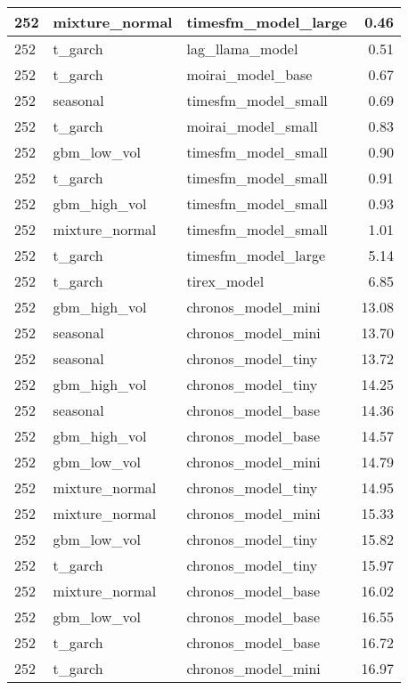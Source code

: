 {\begin{tabular}{lllr}
\midrule
252 & mixture\_normal & timesfm\_model\_large & 0.46 \\
\midrule
252 & t\_garch & lag\_llama\_model & 0.51 \\
\midrule
252 & t\_garch & moirai\_model\_base & 0.67 \\
\midrule
252 & seasonal & timesfm\_model\_small & 0.69 \\
\midrule
252 & t\_garch & moirai\_model\_small & 0.83 \\
\midrule
252 & gbm\_low\_vol & timesfm\_model\_small & 0.90 \\
\midrule
252 & t\_garch & timesfm\_model\_small & 0.91 \\
\midrule
252 & gbm\_high\_vol & timesfm\_model\_small & 0.93 \\
\midrule
252 & mixture\_normal & timesfm\_model\_small & 1.01 \\
\midrule
252 & t\_garch & timesfm\_model\_large & 5.14 \\
\midrule
252 & t\_garch & tirex\_model & 6.85 \\
\midrule
252 & gbm\_high\_vol & chronos\_model\_mini & 13.08 \\
\midrule
252 & seasonal & chronos\_model\_mini & 13.70 \\
\midrule
252 & seasonal & chronos\_model\_tiny & 13.72 \\
\midrule
252 & gbm\_high\_vol & chronos\_model\_tiny & 14.25 \\
\midrule
252 & seasonal & chronos\_model\_base & 14.36 \\
\midrule
252 & gbm\_high\_vol & chronos\_model\_base & 14.57 \\
\midrule
252 & gbm\_low\_vol & chronos\_model\_mini & 14.79 \\
\midrule
252 & mixture\_normal & chronos\_model\_tiny & 14.95 \\
\midrule
252 & mixture\_normal & chronos\_model\_mini & 15.33 \\
\midrule
252 & gbm\_low\_vol & chronos\_model\_tiny & 15.82 \\
\midrule
252 & t\_garch & chronos\_model\_tiny & 15.97 \\
\midrule
252 & mixture\_normal & chronos\_model\_base & 16.02 \\
\midrule
252 & gbm\_low\_vol & chronos\_model\_base & 16.55 \\
\midrule
252 & t\_garch & chronos\_model\_base & 16.72 \\
\midrule
252 & t\_garch & chronos\_model\_mini & 16.97 \\
\bottomrule
\end{tabular}
}